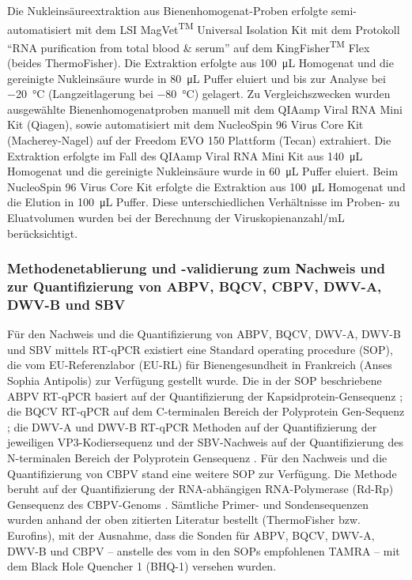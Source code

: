 Die Nukleinsäureextraktion aus Bienenhomogenat-Proben erfolgte semi-automatisiert mit dem LSI MagVet\textsuperscript{TM} Universal Isolation Kit mit dem Protokoll \enquote{RNA purification from total blood \& serum} auf dem KingFisher\textsuperscript{TM} Flex (beides ThermoFisher). Die Extraktion erfolgte aus \SI{100}{\micro\liter} Homogenat und die gereinigte Nukleinsäure wurde in \SI{80}{\micro\liter} Puffer eluiert und bis zur Analyse bei \SI{-20}{\degreeCelsius} (Langzeitlagerung bei \SI{-80}{\degreeCelsius}) gelagert. Zu Vergleichszwecken wurden ausgewählte Bienenhomogenatproben manuell mit dem QIAamp Viral RNA Mini Kit (Qiagen), sowie automatisiert mit dem NucleoSpin\textsuperscript{\textregistered} 96 Virus Core Kit (Macherey-Nagel) auf der Freedom EVO\textsuperscript{\textregistered} 150 Plattform (Tecan) extrahiert. Die Extraktion erfolgte im Fall des QIAamp Viral RNA Mini Kit aus \SI{140}{\micro\liter} Homogenat und die gereinigte Nukleinsäure wurde in \SI{60}{\micro\liter} Puffer eluiert. Beim NucleoSpin\textsuperscript{\textregistered} 96 Virus Core Kit erfolgte die Extraktion aus \SI{100}{\micro\liter} Homogenat und die Elution in \SI{100}{\micro\liter} Puffer. Diese unterschiedlichen Verhältnisse im Proben- zu Eluatvolumen wurden bei der Berechnung der Viruskopienanzahl/\si{\milli\liter} berücksichtigt.

\subsubsection{Methodenetablierung und -validierung zum Nachweis und zur Quantifizierung von ABPV, BQCV, CBPV, DWV-A, DWV-B und SBV}
\label{chap:methoden_abcds}

Für den Nachweis und die Quantifizierung von ABPV, BQCV, DWV-A, DWV-B und SBV mittels RT-qPCR existiert eine Standard operating procedure (SOP), die vom EU-Referenzlabor (EU-RL) für Bienengesundheit in Frankreich (Anses Sophia Antipolis) zur Verfügung gestellt wurde. Die in der SOP beschriebene ABPV RT-qPCR basiert auf der Quantifizierung der Kapsidprotein-Gensequenz \citep{jamnikar2012}; die BQCV RT-qPCR auf dem C-terminalen Bereich der Polyprotein Gen-Sequenz \citep{chantawannakul2006}; die DWV-A und DWV-B RT-qPCR Methoden auf der Quantifizierung der jeweiligen VP3-Kodiersequenz \citep{schurr2019} und der SBV-Nachweis auf der Quantifizierung des N-terminalen Bereich der Polyprotein Gensequenz \citep{blanchard2014}. Für den Nachweis und die Quantifizierung von CBPV stand eine weitere SOP zur Verfügung. Die Methode beruht auf der Quantifizierung der RNA-abhängigen RNA-Polymerase (Rd-Rp) Gensequenz des CBPV-Genoms \citep{blanchard2007}. Sämtliche Primer- und Sondensequenzen wurden anhand der oben zitierten Literatur bestellt (ThermoFisher bzw. Eurofins), mit der Ausnahme, dass die Sonden für ABPV, BQCV, DWV-A, DWV-B und CBPV – anstelle des vom in den SOPs empfohlenen TAMRA – mit dem Black Hole Quencher 1 (BHQ-1) versehen wurden.

